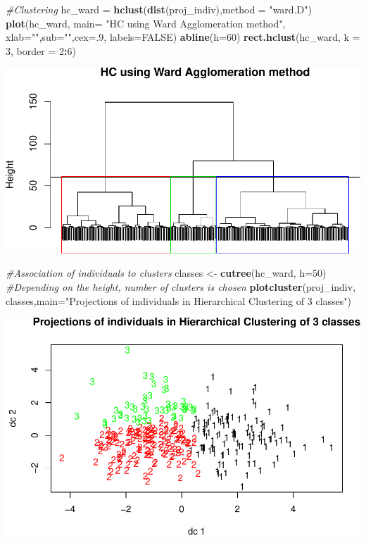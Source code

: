 \documentclass[]{article}
\newenvironment{Shaded}{\begin{snugshade}}{\end{snugshade}}
\newcommand{\KeywordTok}[1]{\textcolor[rgb]{0.13,0.29,0.53}{\textbf{#1}}}
\newcommand{\DataTypeTok}[1]{\textcolor[rgb]{0.13,0.29,0.53}{#1}}
\newcommand{\DecValTok}[1]{\textcolor[rgb]{0.00,0.00,0.81}{#1}}
\newcommand{\StringTok}[1]{\textcolor[rgb]{0.31,0.60,0.02}{#1}}
\newcommand{\CommentTok}[1]{\textcolor[rgb]{0.56,0.35,0.01}{\textit{#1}}}
\newcommand{\OtherTok}[1]{\textcolor[rgb]{0.56,0.35,0.01}{#1}}
\newcommand{\OperatorTok}[1]{\textcolor[rgb]{0.81,0.36,0.00}{\textbf{#1}}}
\newcommand{\NormalTok}[1]{#1}
\begin{document}
\begin{Shaded}
\begin{Highlighting}[]
\CommentTok{#Clustering}
\NormalTok{hc_ward =}\StringTok{ }\KeywordTok{hclust}\NormalTok{(}\KeywordTok{dist}\NormalTok{(proj_indiv),}\DataTypeTok{method =} \StringTok{"ward.D"}\NormalTok{)}
\KeywordTok{plot}\NormalTok{(hc_ward, }\DataTypeTok{main=} \StringTok{"HC using Ward Agglomeration method"}\NormalTok{, }\DataTypeTok{xlab=}\StringTok{""}\NormalTok{,}\DataTypeTok{sub=}\StringTok{""}\NormalTok{,}\DataTypeTok{cex=}\NormalTok{.}\DecValTok{9}\NormalTok{,  }\DataTypeTok{labels=}\OtherTok{FALSE}\NormalTok{)}
\KeywordTok{abline}\NormalTok{(}\DataTypeTok{h=}\DecValTok{60}\NormalTok{)}
\KeywordTok{rect.hclust}\NormalTok{(hc_ward, }\DataTypeTok{k =} \DecValTok{3}\NormalTok{, }\DataTypeTok{border =} \DecValTok{2}\OperatorTok{:}\DecValTok{6}\NormalTok{)}
\end{Highlighting}
\end{Shaded}

\includegraphics{project_report_files/figure-latex/unnamed-chunk-13-2.pdf}

\begin{Shaded}
\begin{Highlighting}[]
\CommentTok{#Association of individuals to clusters}
\NormalTok{classes <-}\StringTok{ }\KeywordTok{cutree}\NormalTok{(hc_ward, }\DataTypeTok{h=}\DecValTok{50}\NormalTok{) }\CommentTok{#Depending on the height, number of clusters is chosen}
\KeywordTok{plotcluster}\NormalTok{(proj_indiv, classes,}\DataTypeTok{main=}\StringTok{"Projections of individuals in Hierarchical Clustering of 3 classes"}\NormalTok{)}
\end{Highlighting}
\end{Shaded}

\includegraphics{project_report_files/figure-latex/unnamed-chunk-13-3.pdf}
\end{document}
